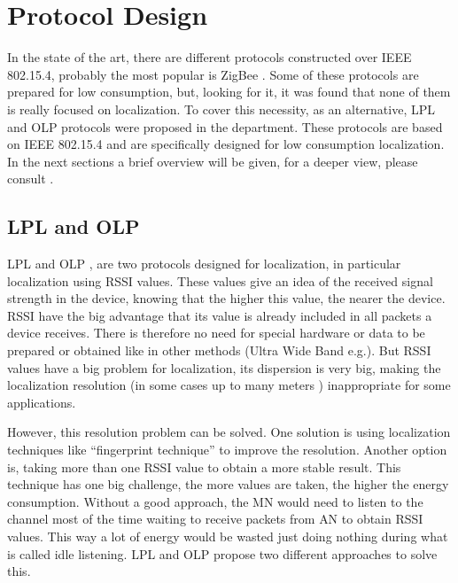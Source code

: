 \chapter{Protocol Design}
\label{chap:protocoldesign}

In the state of the art, there are different protocols constructed over \ac{IEEE} 802.15.4, probably the most popular is ZigBee \cite{Zigbee}. 
Some of these protocols are prepared for low consumption, but, looking for it, it was found that none of them is really focused on localization. 
To cover this necessity, as an alternative, \ac{LPL} and \ac{OLP} \cite{LPLandOLP} protocols were proposed in the department. These protocols 
are based on \ac{IEEE} 802.15.4 and are specifically designed for low consumption localization. In the next sections a brief overview will be 
given, for a deeper view, please consult \cite{LPLandOLP}.

\section{\ac{LPL} and \ac{OLP}}

\ac{LPL} and \ac{OLP} \cite{LPLandOLP}, are two protocols designed for localization, in particular localization using \ac{RSSI} 
values. These values give an idea of the received signal strength in the device, knowing that the higher this value,
the nearer the device. \ac{RSSI} have the big advantage that its value is already included in all packets a device receives. There
is therefore no need for special hardware or data to be prepared or obtained like in other methods (Ultra Wide Band e.g.). But \ac{RSSI} 
values have a big problem for localization, its dispersion is very big, making the localization resolution (in some cases up to 
many meters \cite{fingerprint}) inappropriate for some applications. 

However, this resolution problem can be solved. One solution is using localization techniques like ``fingerprint 
technique'' \cite{fingerprint} to improve the resolution. Another option is, taking more than one \ac{RSSI} value to obtain a more stable 
result. This technique has one big challenge, the more values are taken, the higher the energy consumption. Without a good approach, 
the \ac{MN} would need to listen to the channel most of the time waiting to receive packets from \ac{AN} to obtain \ac{RSSI} values. 
This way a lot of energy would be wasted just doing nothing during what is called idle listening. \ac{LPL} and \ac{OLP} propose two different 
approaches to solve this.

